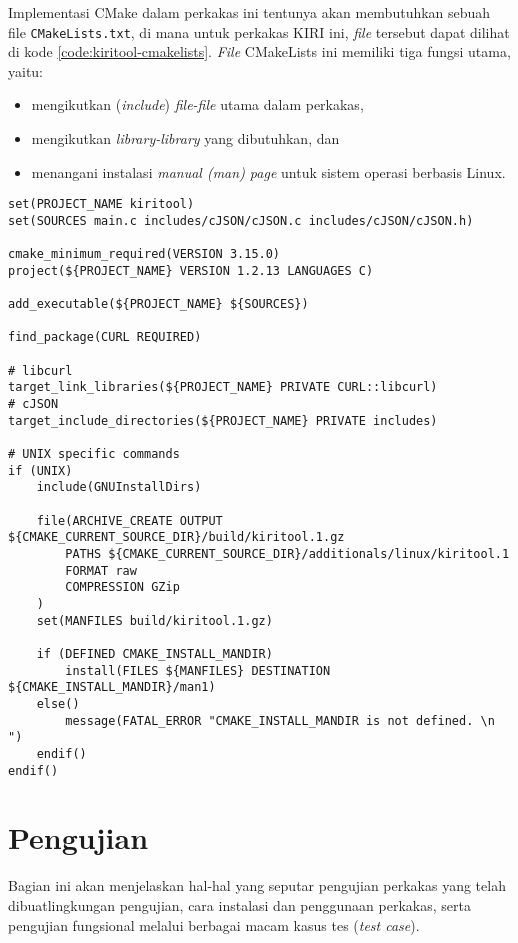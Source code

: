 Implementasi CMake dalam perkakas ini tentunya akan membutuhkan sebuah file \verb|CMakeLists.txt|, di mana untuk perkakas \cl KIRI ini, \textit{file} tersebut dapat dilihat di kode \ref{code:kiritool-cmakelists}. \textit{File} CMakeLists ini memiliki tiga fungsi utama, yaitu:

\begin{itemize}
	\item mengikutkan (\textit{include}) \textit{file-file} utama dalam perkakas,
	\item mengikutkan \textit{library-library} yang dibutuhkan, dan
	\item menangani instalasi \textit{manual (man) page} untuk sistem operasi berbasis Linux. 
\end{itemize}

\begin{lstlisting}[language={}, caption=Implementasi fungsi print\textunderscore help(), label=code:kiritool-cmakelists]
set(PROJECT_NAME kiritool)
set(SOURCES main.c includes/cJSON/cJSON.c includes/cJSON/cJSON.h)

cmake_minimum_required(VERSION 3.15.0)
project(${PROJECT_NAME} VERSION 1.2.13 LANGUAGES C)

add_executable(${PROJECT_NAME} ${SOURCES})

find_package(CURL REQUIRED)

# libcurl
target_link_libraries(${PROJECT_NAME} PRIVATE CURL::libcurl)
# cJSON
target_include_directories(${PROJECT_NAME} PRIVATE includes)

# UNIX specific commands
if (UNIX)
    include(GNUInstallDirs)

    file(ARCHIVE_CREATE OUTPUT ${CMAKE_CURRENT_SOURCE_DIR}/build/kiritool.1.gz
        PATHS ${CMAKE_CURRENT_SOURCE_DIR}/additionals/linux/kiritool.1
        FORMAT raw
        COMPRESSION GZip
    )
    set(MANFILES build/kiritool.1.gz)

    if (DEFINED CMAKE_INSTALL_MANDIR)
        install(FILES ${MANFILES} DESTINATION ${CMAKE_INSTALL_MANDIR}/man1)
    else()
        message(FATAL_ERROR "CMAKE_INSTALL_MANDIR is not defined. \n  ")
    endif()
endif()
\end{lstlisting}

\section{Pengujian}
\label{sec:testing-experiments}

Bagian ini akan menjelaskan hal-hal yang seputar pengujian perkakas yang telah dibuat\textemdash lingkungan pengujian, cara instalasi dan penggunaan perkakas, serta pengujian fungsional melalui berbagai macam kasus tes (\textit{test case}).

